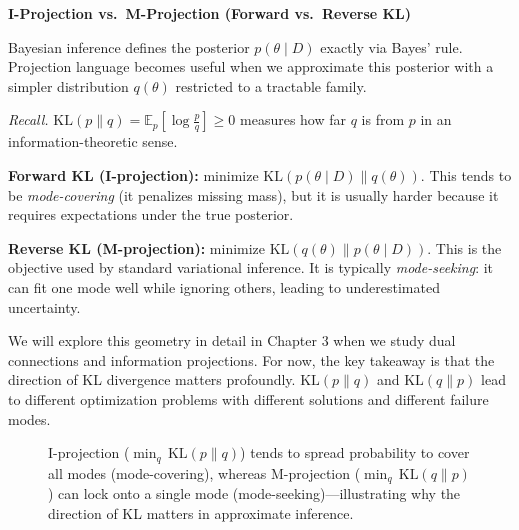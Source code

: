 \begin{geometrylens}
\textbf{I-Projection vs.\ M-Projection (Forward vs.\ Reverse KL)}

\vspace{0.5em}

Bayesian inference defines the posterior $p(\theta \mid D)$ exactly via Bayes' rule. Projection language becomes useful when we approximate this posterior with a simpler distribution $q(\theta)$ restricted to a tractable family.

\vspace{0.5em}

\noindent\textit{Recall.} $\text{KL}(p\|q)=\mathbb{E}_{p}\!\left[\log\frac{p}{q}\right]\ge 0$ measures how far $q$ is from $p$ in an information-theoretic sense.

\vspace{0.5em}

\noindent\textbf{Forward KL (I-projection):} minimize $\text{KL}(p(\theta \mid D) \| q(\theta))$. This tends to be \emph{mode-covering} (it penalizes missing mass), but it is usually harder because it requires expectations under the true posterior.

\vspace{0.5em}

\noindent\textbf{Reverse KL (M-projection):} minimize $\text{KL}(q(\theta) \| p(\theta \mid D))$. This is the objective used by standard variational inference. It is typically \emph{mode-seeking}: it can fit one mode well while ignoring others, leading to underestimated uncertainty.

\vspace{0.5em}

We will explore this geometry in detail in Chapter 3 when we study dual connections and information projections. For now, the key takeaway is that the direction of KL divergence matters profoundly. $\text{KL}(p \| q)$ and $\text{KL}(q \| p)$ lead to different optimization problems with different solutions and different failure modes.
\end{geometrylens}

\begin{figure}[t]
\centering

\caption{I-projection ($\min_{q}\, \mathrm{KL}(p\|q)$) tends to spread probability to cover all modes (mode-covering), whereas M-projection ($\min_{q}\, \mathrm{KL}(q\|p)$) can lock onto a single mode (mode-seeking)---illustrating why the direction of KL matters in approximate inference.}
\label{fig:projections}
\end{figure}

